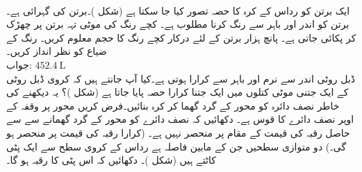 \\
ایک برتن کو رداس  کے کرہ کا حصہ تصور کیا جا سکتا ہے (شکل )۔برتن کی گہرائی  ہے۔برتن کو اندر اور باہر سے رنگ کرنا مطلوب ہے۔ کچے رنگ کی  موٹی تہہ برتن پر چھڑک کر پکائی جاتی ہے۔ پانچ ہزار برتن کے لئے درکار کچے رنگ کا حجم معلوم کریں۔ رنگ کے ضیاع کو نظر انداز کریں۔\\
جواب:\quad
$\SI{452.4}{\liter}$
\\
ڈبل روٹی اندر سے نرم اور باہر سے کرارا ہوتی ہے۔کیا آپ جانتے ہیں کہ کروی ڈبل روٹی کے ایک جتنی موٹی کتلوں میں  ایک جتنا کرارا حصہ پایا جاتا ہے (شکل )؟ یہ دیکھنے کی خاطر نصف دائرہ  کو  محور کے گرد گھما کر کرہ بنائیں۔فرض کریں محور  پر وقفہ  کے اوپر نصف دائرے کا قوس  ہے۔ دکھائیں کہ نصف دائرے کو  محور کے گرد گھمانے سے  سے حاصل رقبہ  کی قیمت  کے مقام پر منحصر نہیں ہے۔ (کرارا رقبہ کی قیمت  پر منحصر ہو گی۔)
دو متوازی سطحیں جن کے مابین فاصلہ  ہے رداس  کے کروی سطح سے ایک پٹی کاٹتے ہیں (شکل )۔ دکھائیں کہ اس پٹی کا رقبہ  ہو گا۔   
